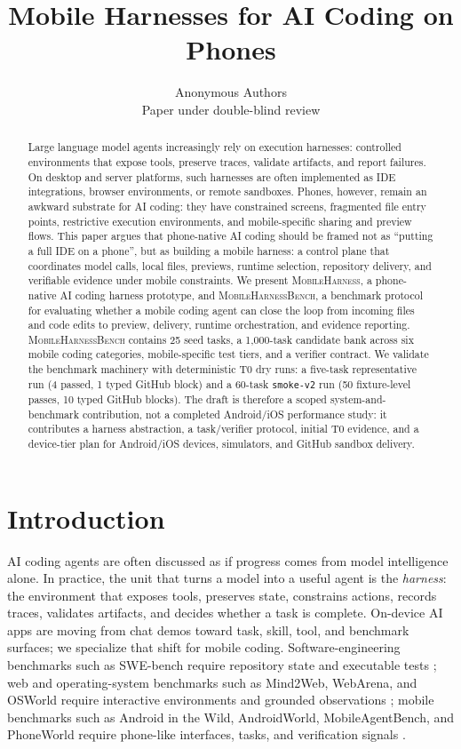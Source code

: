 \documentclass{article}
\title{Mobile Harnesses for AI Coding on Phones}
\author{Anonymous Authors\\
Paper under double-blind review}
\newcommand{\mhb}{\textsc{MobileHarnessBench}}
\newcommand{\prototype}{\textsc{MobileHarness}}
\begin{document}
\maketitle

\begin{abstract}
Large language model agents increasingly rely on execution harnesses: controlled environments that expose tools, preserve traces, validate artifacts, and report failures.
On desktop and server platforms, such harnesses are often implemented as IDE integrations, browser environments, or remote sandboxes.
Phones, however, remain an awkward substrate for AI coding: they have constrained screens, fragmented file entry points, restrictive execution environments, and mobile-specific sharing and preview flows.
This paper argues that phone-native AI coding should be framed not as ``putting a full IDE on a phone'', but as building a mobile harness: a control plane that coordinates model calls, local files, previews, runtime selection, repository delivery, and verifiable evidence under mobile constraints.
We present \prototype{}, a phone-native AI coding harness prototype, and \mhb{}, a benchmark protocol for evaluating whether a mobile coding agent can close the loop from incoming files and code edits to preview, delivery, runtime orchestration, and evidence reporting.
\mhb{} contains 25 seed tasks, a 1,000-task candidate bank across six mobile coding categories, mobile-specific test tiers, and a verifier contract.
We validate the benchmark machinery with deterministic T0 dry runs: a five-task representative run (4 passed, 1 typed GitHub block) and a 60-task \texttt{smoke-v2} run (50 fixture-level passes, 10 typed GitHub blocks).
The draft is therefore a scoped system-and-benchmark contribution, not a completed Android/iOS performance study: it contributes a harness abstraction, a task/verifier protocol, initial T0 evidence, and a device-tier plan for Android/iOS devices, simulators, and GitHub sandbox delivery.
\end{abstract}

\section{Introduction}

AI coding agents are often discussed as if progress comes from model intelligence alone.
In practice, the unit that turns a model into a useful agent is the \emph{harness}: the environment that exposes tools, preserves state, constrains actions, records traces, validates artifacts, and decides whether a task is complete.
On-device AI apps are moving from chat demos toward task, skill, tool, and benchmark surfaces; we specialize that shift for mobile coding.
Software-engineering benchmarks such as SWE-bench require repository state and executable tests \citep{swebench}; web and operating-system benchmarks such as Mind2Web, WebArena, and OSWorld require interactive environments and grounded observations \citep{mind2web, webarena, osworld}; mobile benchmarks such as Android in the Wild, AndroidWorld, MobileAgentBench, and PhoneWorld require phone-like interfaces, tasks, and verification signals \citep{aitw, androidworld, mobileagentbench, phoneworld}.
\end{document}
